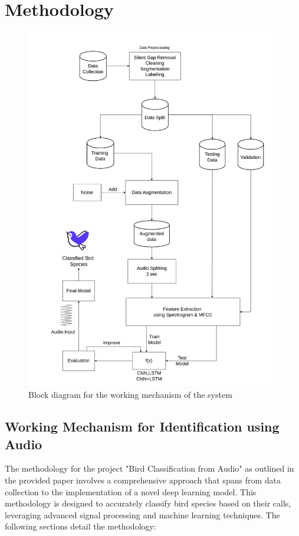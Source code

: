 \chapter{Methodology}
\begin{figure}[h!]
    \centering
        \includegraphics[scale=0.37]{images/Methodology.png}
        \caption{Block diagram for the working mechanism of the system}%
    \end{figure}
\newpage
\section{Working Mechanism for Identification using Audio}
The methodology for the project "Bird Classification from Audio" as outlined in the provided paper involves a comprehensive approach that spans from data collection to the implementation of a novel deep learning model. This methodology is designed to accurately classify bird species based on their calls, leveraging advanced signal processing and machine learning techniques. The following sections detail the methodology:

